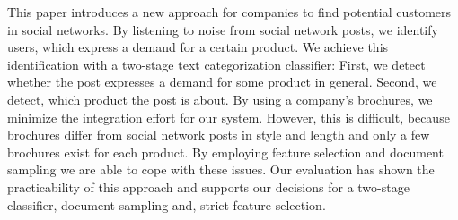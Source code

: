 
This paper introduces a new approach for companies to find potential customers in social networks.
By listening to noise from social network posts, we identify users, which express a demand for a certain product.
We achieve this identification with a two-stage text categorization classifier:
First, we detect whether the post  expresses a demand for some product in general.
Second, we detect, which product the post is about.
By using a company's brochures, we minimize the integration effort for our system.
However, this is difficult, because brochures differ from social network posts in style and length and only a few brochures exist for each product.
By employing feature selection and document sampling we are able to cope with these issues.
Our evaluation has shown the practicability of this approach and supports our decisions for a two-stage classifier, document sampling and, strict feature selection.
